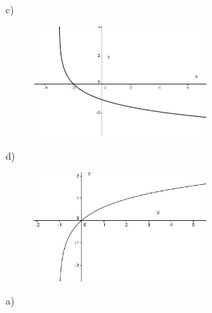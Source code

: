 \documentclass[12pt]{article}
\begin{document}
\begin{enumerate}
\vspace{\baselineskip}
c)\par




\begin{figure}[H]
	\begin{Center}
		\includegraphics[width=2.56in,height=1.62in]{./media/image32.JPG}
	\end{Center}
\end{figure}



\par


\vspace{\baselineskip}
d)\par




\begin{figure}[H]
	\begin{Center}
		\includegraphics[width=2.55in,height=1.61in]{./media/image33.JPG}
	\end{Center}
\end{figure}



\par


\vspace{\baselineskip}

\vspace{\baselineskip}

\end{enumerate}
\vspace{\baselineskip}
a)\par
\end{document}
